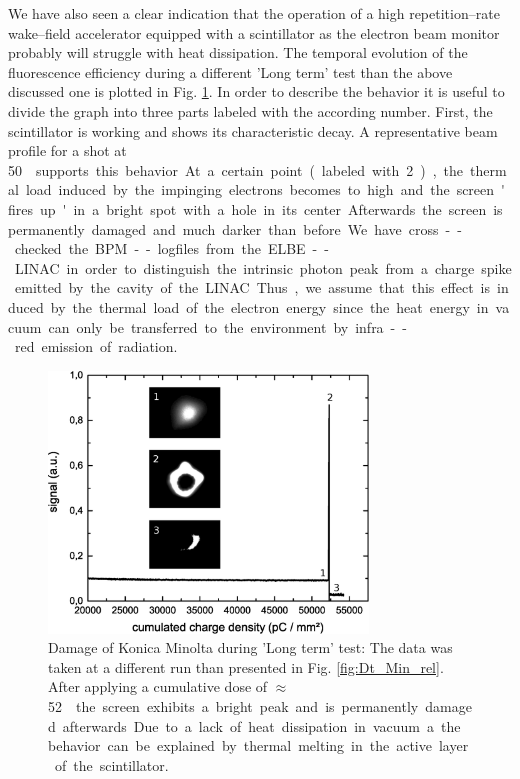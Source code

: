\documentclass[%
preprint,
amsmath,
amssymb,
aip,
rsi, 
numerical,
floatfix,
]{revtex4-1}
\begin{document}
We have also seen a clear indication that the operation of a high repetition--rate wake--field accelerator equipped with a scintillator as the electron beam monitor probably will struggle with heat dissipation.
The temporal evolution of the fluorescence efficiency during a different 'Long term' test than the above discussed one is plotted in Fig. \ref{fig:Damage}.
In order to describe the behavior it is useful to divide the graph into three parts labeled with the according number. 
First, the scintillator is working and shows its characteristic decay. 
A representative beam profile for a shot at \SI[per-mode=symbol]{50}{\nano\coulomb \per \milli\meter\square}  supports this behavior.
At a certain point (labeled with 2), the thermal load induced by the impinging electrons becomes to high and the screen 'fires up' in a bright spot with a hole in its center.
Afterwards the screen is permanently damaged and much darker than before.
We have cross--checked the BPM--logfiles from the ELBE--LINAC in order to distinguish the intrinsic photon peak from a charge spike emitted by the cavity of the LINAC.
Thus, we assume that this effect is induced by the thermal load of the electron energy since the heat energy in vacuum can only be transferred to the environment by infra--red emission of radiation.

\begin{figure}
\includegraphics[width=8.5cm]{./Figures/Damage}%
\caption{\label{fig:Damage} Damage of Konica Minolta during 'Long term' test: 
The data was taken at a different run than presented in Fig. \ref{fig:Dt_Min_rel}. 
After applying a cumulative dose of $\approx$ \SI[per-mode=symbol]{52}{\nano\coulomb \per \milli\meter\square} the screen exhibits a bright peak and is permanently damaged afterwards. 
Due to a lack of heat dissipation in vacuum a the behavior can be explained by thermal melting in the active layer of the scintillator.}
\end{figure}
\end{document}
